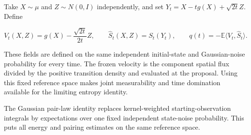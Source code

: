 \documentclass[11pt,a4paper]{report}
\begin{document}
Take \(X\sim\mu\) and \(Z\sim N(0,I)\) independently, and set \(Y_t=X-tg(X)+\sqrt{2t}Z\). Define

\[V_t(X,Z)=g(X)-\frac{\sqrt{2t}}{2t}Z,\qquad \widehat S_t(X,Z)=S_t(Y_t),\qquad q(t)=-\mathbb E\langle V_t,\widehat S_t\rangle.\]

These fields are defined on the same independent initial-state and Gaussian-noise probability for every time. The frozen velocity is the component spatial flux divided by the positive transition density and evaluated at the proposal. Using this fixed reference space makes joint measurability and time domination available for the limiting entropy identity.



The Gaussian pair-law identity replaces kernel-weighted starting-observation integrals by expectations over one fixed independent state-noise probability. This puts all energy and pairing estimates on the same reference space.
\end{document}
